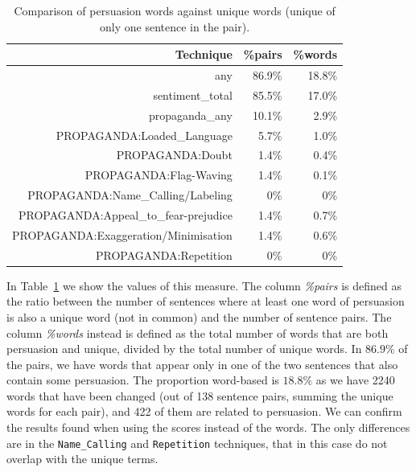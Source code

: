 \begin{table}[!htbp]
    \centering
    \begin{tabular}{r|rr}
         Technique & \%pairs & \%words \\
         \hline
         any & 86.9\% & 18.8\% \\
        sentiment\_total & 85.5\% & 17.0\% \\
        propaganda\_any & 10.1\% & 2.9\% \\
        PROPAGANDA:Loaded\_Language & 5.7\% & 1.0\% \\
        PROPAGANDA:Doubt & 1.4\% & 0.4\% \\
        PROPAGANDA:Flag-Waving & 1.4\% & 0.1\% \\
        PROPAGANDA:Name\_Calling/Labeling & 0\% & 0\% \\
        PROPAGANDA:Appeal\_to\_fear-prejudice & 1.4\% & 0.7\% \\
        PROPAGANDA:Exaggeration/Minimisation & 1.4\% & 0.6\% \\
        PROPAGANDA:Repetition & 0\% & 0\% \\
    \end{tabular}
    \caption{Comparison of persuasion words against unique words (unique of only one sentence in the pair).}
    \label{tab:words_persuasion_in_variations}
\end{table}

In Table~\ref{tab:words_persuasion_in_variations} we show the values of this measure.
The column \textit{\%pairs} is defined as the ratio between the number of sentences where at least one word of persuasion is also a unique word (not in common) and the number of sentence pairs. The column \textit{\%words} instead is defined as the total number of words that are both persuasion and unique, divided by the total number of unique words.
In $86.9\%$ of the pairs, we have words that appear only in one of the two sentences that also contain some persuasion. The proportion word-based is $18.8\%$ as we have 2240 words that have been changed (out of 138 sentence pairs, summing the unique words for each pair), and 422 of them are related to persuasion.
We can confirm the results found when using the scores instead of the words. The only differences are in the \texttt{Name\_Calling} and \texttt{Repetition} techniques, that in this case do not overlap with the unique terms.



